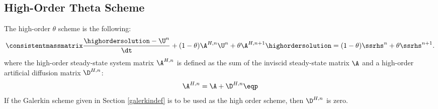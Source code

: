\subsection{High-Order Theta Scheme}
The high-order $\theta$ scheme is the following:
\begin{equation}\label{high_theta}
  \consistentmassmatrix\frac{\highordersolution-\U^n}{\dt}
  + (1-\theta)\A^{H,n}\U^n + \theta\A^{H,n+1}\highordersolution
  = (1-\theta)\ssrhs^n + \theta\ssrhs^{n+1}.
\end{equation}
where the high-order steady-state system matrix $\A^{H,n}$ is
defined as the sum of the inviscid steady-state matrix $\A$
and a high-order artificial diffusion matrix $\D^{H,n}$:
\begin{equation}
   \A^{H,n} = \A + \D^{H,n} \eqp
\end{equation}
If the Galerkin scheme given in Section \ref{galerkindef} is to be
used as the high order scheme, then $\D^{H,n}$ is zero.

